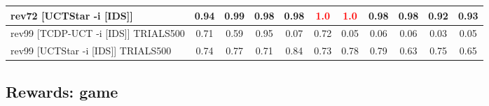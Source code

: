 \documentclass{article}
\begin{document}
\begin{tabular}{|l|r@{$\pm$}rr@{$\pm$}rr@{$\pm$}rr@{$\pm$}rr@{$\pm$}rr@{$\pm$}rr@{$\pm$}rr@{$\pm$}rr@{$\pm$}rr@{$\pm$}r|}
\\
rev72 [UCTStar -i [IDS]]
& \multicolumn{2}{c}{0.94}
& \multicolumn{2}{c}{0.99}
& \multicolumn{2}{c}{0.98}
& \multicolumn{2}{c}{0.98}
& \multicolumn{2}{c}{\textbf{\textcolor{red}{1.0}}}
& \multicolumn{2}{c}{\textbf{\textcolor{red}{1.0}}}
& \multicolumn{2}{c}{0.98}
& \multicolumn{2}{c}{0.98}
& \multicolumn{2}{c}{0.92}
& \multicolumn{2}{c|}{0.93}
\\
\hline
rev99 [TCDP-UCT -i [IDS]] TRIALS500
& \multicolumn{2}{c}{0.71}
& \multicolumn{2}{c}{0.59}
& \multicolumn{2}{c}{0.95}
& \multicolumn{2}{c}{0.07}
& \multicolumn{2}{c}{0.72}
& \multicolumn{2}{c}{0.05}
& \multicolumn{2}{c}{0.06}
& \multicolumn{2}{c}{0.06}
& \multicolumn{2}{c}{0.03}
& \multicolumn{2}{c|}{0.05}
\\
rev99 [UCTStar -i [IDS]] TRIALS500
& \multicolumn{2}{c}{0.74}
& \multicolumn{2}{c}{0.77}
& \multicolumn{2}{c}{0.71}
& \multicolumn{2}{c}{0.84}
& \multicolumn{2}{c}{0.73}
& \multicolumn{2}{c}{0.78}
& \multicolumn{2}{c}{0.79}
& \multicolumn{2}{c}{0.63}
& \multicolumn{2}{c}{0.75}
& \multicolumn{2}{c|}{0.65}
\\
\hline
\end{tabular}%

\bigskip

\subsection*{Rewards: game}
\end{document}
